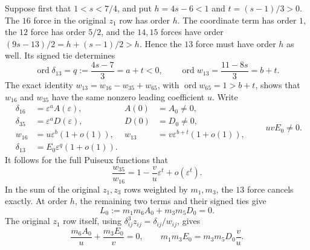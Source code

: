 \documentclass[11pt]{amsart}
\theoremstyle{remark}
\newcommand{\ord}{\operatorname{ord}}
\begin{document}
Suppose first that $1<s<7/4$, and put
$h=4s-6<1$ and $t=(s-1)/3>0$.
The $16$ force in the original $z_1$ row has order $h$.
The coordinate term has order $1$, the $12$ force has order
$5/2$, and the $14,15$ forces have order
$(9s-13)/2=h+(s-1)/2>h$. Hence the $13$ force must have
order $h$ as well. Its signed tie determines
\begin{equation}\label{eq:no50-resonance-orders}
 \ord\delta_{13}=q:=\frac{4s-7}{3}=a+t<0,\qquad
 \ord w_{13}=\frac{11-8s}{3}=b+t.
\end{equation}
The exact identity $w_{13}=w_{16}-w_{35}+w_{65}$, with
$\ord w_{65}=1>b+t$, shows that $w_{16}$ and $w_{35}$
have the same nonzero leading coefficient $u$. Write
\[
 \begin{aligned}
 \delta_{16}&=\varepsilon^a A(\varepsilon),&A(0)&=A_0\ne0,\\
 \delta_{35}&=\varepsilon^a D(\varepsilon),&D(0)&=D_0\ne0,\\
 w_{16}&=u\varepsilon^b(1+o(1)),&
 w_{13}&=v\varepsilon^{b+t}(1+o(1)),\\
 \delta_{13}&=E_0\varepsilon^q(1+o(1)).&&
 \end{aligned}
 \qquad uvE_0\ne0.
\]
It follows for the full Puiseux functions that
\begin{equation}\label{eq:no50-w-ratio}
 \frac{w_{35}}{w_{16}}
 =1-\frac vu\varepsilon^t+o(\varepsilon^t).
\end{equation}
In the sum of the original $z_1,z_3$ rows weighted by
$m_1,m_3$, the $13$ force cancels exactly. At order $h$,
the remaining two terms and their signed ties give
\begin{equation}\label{eq:no50-leading-cancellation}
 L_0:=m_1m_6A_0+m_3m_5D_0=0.
\end{equation}
The original $z_1$ row itself, using
$\delta_{ij}^3z_{ij}=\delta_{ij}/w_{ij}$, gives
\begin{equation}\label{eq:no50-E-coefficient}
 \frac{m_6A_0}{u}+\frac{m_3E_0}{v}=0,
 \qquad m_1m_3E_0=m_3m_5D_0\frac vu.
\end{equation}
\end{document}
